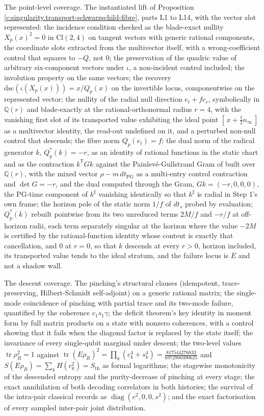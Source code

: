 \documentclass[11pt]{article}
\theoremstyle{definition}
\theoremstyle{plain}
\providecommand{\Cl}{}\renewcommand{\Cl}{\mathrm{Cl}}
\providecommand{\Sth}{}\renewcommand{\Sth}{S_{\mathrm{th}}}
\providecommand{\dsc}{}\renewcommand{\dsc}{\mathrm{dsc}}
\providecommand{\er}{}\renewcommand{\er}{e_r}
\providecommand{\et}{}\renewcommand{\et}{e_t}
\providecommand{\nInf}{}\renewcommand{\nInf}{n_\infty}
\providecommand{\tr}{}\renewcommand{\tr}{\operatorname{tr}}
\begin{document}
The point-level coverage. The instantiated lift of Proposition \ref{c:singularity.transport-schwarzschild-fibre}, parts L1 to L14, with the vector slot represented: the incidence condition checked as the blade-exact nullity $X_p(x)^{2} = 0$ in $\Cl(2,4)$ on tangent vectors with generic rational components, the coordinate slots extracted from the multivector itself, with a wrong-coefficient control that squares to $-Q$, not $0$; the preservation of the quadric value of arbitrary six-component vectors under $\iota$, a non-incident control included; the involution property on the same vectors; the recovery $\dsc(\iota(X_p(x))) = x/Q_p(x)$ on the invertible locus, componentwise on the represented vector; the nullity of the radial null direction $\et + f\er$, symbolically in $\mathbb{Q}(r)$ and blade-exactly at the rational-orthonormal radius $r = 4$, with the vanishing first slot of its transported value exhibiting the ideal point $[\,x + \tfrac12\nInf\,]$ as a multivector identity, the read-out undefined on it, and a perturbed non-null control that descends; the fibre norm $Q_p(\et) = f$; the dual norm of the radical generator $k$, $Q^*_p(k) = -r$, as an identity of rational functions in the static chart and as the contraction $k^{\mathsf T}Gk$ against the Painlev\'e-Gullstrand Gram of \cite[Thm.~8.7]{ButlerT4} built over $\mathbb{Q}(r)$, with the mixed vector $\rho - m\,dt_{\mathrm{PG}}$ as a multi-entry control contraction and $\det G = -r$, and the dual computed through the Gram, $Gk = (-r, 0, 0, 0)$, the PG-time component of $k^{\sharp}$ vanishing identically so that $k^{\sharp}$ is radial in Step 1's own frame; the horizon pole of the static norm $1/f$ of $dt_s$ probed by evaluation; $Q^*_p(k)$ rebuilt pointwise from its two unreduced terms $2M/f$ and $-r/f$ at off-horizon radii, each term separately singular at the horizon where the value $-2M$ is certified by the rational-function identity whose content is exactly that cancellation, and $0$ at $r = 0$, so that $k$ descends at every $r > 0$, horizon included, its transported value tends to the ideal stratum, and the failure locus is $E$ and not a shadow wall.

The descent coverage. The pinching's structural clauses (idempotent, trace-preserving, Hilbert-Schmidt self-adjoint) on a generic rational matrix; the single-mode coincidence of pinching with partial trace and its two-mode failure, quantified by the coherence $c_1 s_1 \gamma$; the deficit theorem's key identity in moment form by full matrix products on a state with nonzero coherences, with a control showing that it fails when the diagonal factor is replaced by the state itself; the invariance of every single-qubit marginal under descent; the two-level values $\tr\rho_R^2 = 1$ against $\tr(E\rho_R)^2 = \prod_k(c_k^4 + s_k^4) = \tfrac{817544276833}{6972900390625}$ and $S(E\rho_R) = \sum_k H(c_k^{2}) = \Sth$ as formal logarithms; the stagewise monotonicity of the descended entropy and the purity-decrease of pinching at every stage; the exact annihilation of both decoding correlators in both histories; the survival of the intra-pair classical records as $\operatorname{diag}(c^2, 0, 0, s^2)$; and the exact factorisation of every sampled inter-pair joint distribution.
\end{document}
